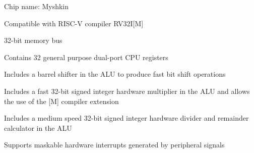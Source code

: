 \item Chip name: Myshkin
\item Compatible with RISC-V compiler RV32I[M]
\item 32-bit memory bus
\item Contains 32 general purpose dual-port CPU registers
\item Includes a barrel shifter in the ALU to produce fast bit shift operations
\item Includes a fast 32-bit signed integer hardware multiplier in the ALU and allows the use of the [M] compiler extension
\item Includes a medium speed 32-bit signed integer hardware divider and remainder calculator in the ALU
\item Supports maskable hardware interrupts generated by peripheral signals
